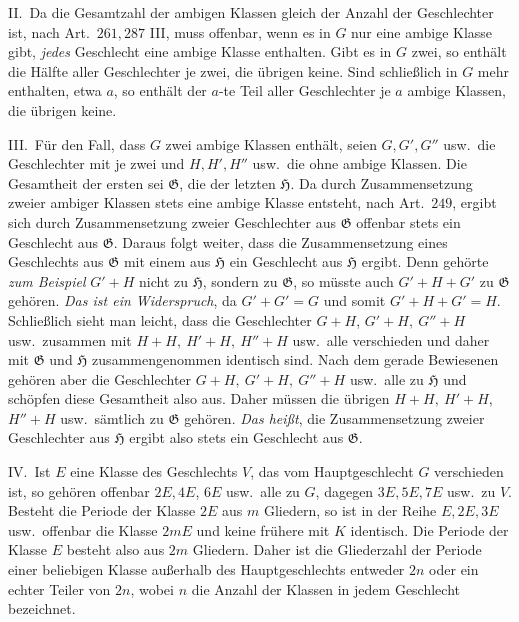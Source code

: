 II.\ Da die Gesamtzahl der ambigen Klassen gleich der Anzahl der Geschlechter ist, nach Art.\ \(261,287\) III, muss offenbar, wenn es in \(G\) nur eine ambige
Klasse gibt, \textit{jedes} Geschlecht eine ambige Klasse enthalten. Gibt es in \(G\) zwei, so enthält die Hälfte aller Geschlechter je zwei, die übrigen keine. Sind schließlich in \(G\) mehr enthalten, etwa \(a\), so enthält der \(a\)-te Teil aller Geschlechter je \(a\) ambige Klassen, die übrigen keine.

III.\ Für den Fall, dass \(G\) zwei ambige Klassen enthält, seien \(G,G',G''\) usw.\ die Geschlechter mit je zwei und \(H,H',H''\) usw.\ die ohne ambige Klassen. Die Gesamtheit der ersten sei \(\mathfrak G\), die der letzten \(\mathfrak H\). Da durch Zusammensetzung zweier ambiger Klassen stets eine ambige Klasse entsteht, nach Art.\ \(249\), ergibt sich durch Zusammensetzung zweier Geschlechter aus \(\mathfrak G\) offenbar stets ein Geschlecht aus \(\mathfrak G\). Daraus folgt weiter, dass die Zusammensetzung eines Geschlechts aus \(\mathfrak G\) mit einem aus \(\mathfrak H\) ein Geschlecht aus \(\mathfrak H\) ergibt. Denn gehörte \textit{zum Beispiel} \(G'+H\) nicht zu \(\mathfrak H\), sondern zu \(\mathfrak G\), so müsste auch \(G'+H+G'\) zu \(\mathfrak G\) gehören. \textit{Das ist ein Widerspruch}, da \(G'+G'=G\) und somit \(G'+H+G'=H\). Schließlich sieht man leicht, dass die Geschlechter \(G+H\), \(G'+H,\ G''+H\) usw.\ zusammen mit \(H+H,\ H'+H,\ H''+H\) usw.\ alle verschieden und daher mit \(\mathfrak G\) und \(\mathfrak H\) zusammengenommen identisch sind. Nach dem gerade Bewiesenen gehören aber die Geschlechter \(G+H,\ G'+H,\ G''+H\) usw.\ alle zu \(\mathfrak H\) und schöpfen diese Gesamtheit also aus. Daher müssen die übrigen \(H+H,\ H'+H\), \(H''+H\) usw.\ sämtlich zu \(\mathfrak G\) gehören. \textit{Das heißt}, die Zusammensetzung zweier Geschlechter aus \(\mathfrak H\) ergibt also stets ein Geschlecht aus \(\mathfrak G\).

IV.\ Ist \(E\) eine Klasse des Geschlechts \(V\), das vom Hauptgeschlecht \(G\) verschieden ist, so gehören offenbar \(2E,4E\), \(6E\) usw.\ alle zu \(G\), dagegen \(3E,5E,7E\) usw.\ zu \(V\). Besteht die Periode der Klasse \(2E\) aus \(m\) Gliedern, so ist in der Reihe \(E,2E,3E\) usw.\ offenbar die Klasse \(2mE\) und keine frühere mit \(K\) identisch. Die Periode der Klasse \(E\) besteht also aus \(2m\) Gliedern. Daher ist die Gliederzahl der Periode einer beliebigen Klasse außerhalb des Hauptgeschlechts entweder \(2n\) oder ein echter Teiler von \(2n\), wobei \(n\) die Anzahl der Klassen in jedem Geschlecht bezeichnet.

